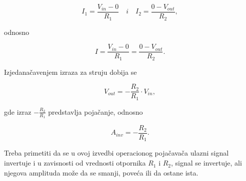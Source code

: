 \begin{equation}
    I_1 = \frac{V_{in} - 0}{R_1} \quad i \quad I_2 = \frac{0 - V_{out}}{R_2},
\end{equation}

{odnosno}

\begin{equation}
    I = \frac{V_{in} - 0}{R_1} = \frac{0 - V_{out}}{R_2}.
\end{equation}

{Izjedanačavenjem izraza za struju dobija se}

\begin{equation}
    V_{out} = -\frac{R_2}{R_1} \cdot V_{in},
\end{equation}

{gde izraz $-\frac{R_2}{R_1}$ predstavlja pojačanje, odnosno}

\begin{equation}
    A_{inv} = -\frac{R_2}{R_1}.
\end{equation}

{Treba primetiti da se u ovoj izvedbi operacionog pojačavača ulazni signal invertuje i u zavisnosti od vrednosti otpornika $R_1$ i $R_2$, signal se invertuje, ali njegova amplituda može da se smanji, poveća ili da ostane ista.}
